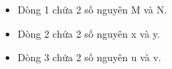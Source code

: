\begin{itemize}
	\item     Dòng 1 chứa 2 số nguyên M và N.   
	\item     Dòng 2 chứa 2 số nguyên x và y.   
	\item     Dòng 3 chứa 2 số nguyên u và v.   
\end{itemize}
